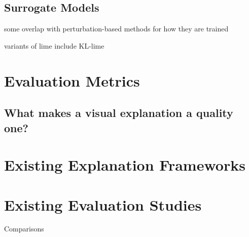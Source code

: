 \documentclass[main]{subfiles}
\begin{document}
\subsection{Surrogate Models}
some overlap with perturbation-based methods for how they are trained



variants of lime include KL-lime

\section{Evaluation Metrics}

\subsection{What makes a visual explanation a quality one?}










\section{Existing Explanation Frameworks}






\section{Existing Evaluation Studies}

Comparisons

\end{document}
